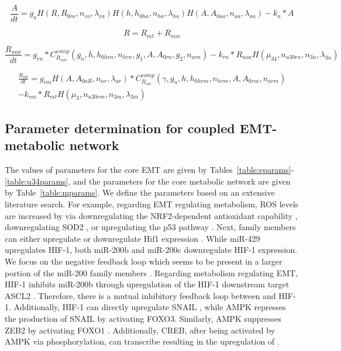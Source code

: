 \documentclass{article}
\begin{document}
\begin{equation}
\frac{A}{dt}= g_a H(R,R_{0ra},n_{ra}, \lambda_{ra}) H(h, h_{0ha},n_{ha}, \lambda_{ha}) H(A, A_{0aa},n_{aa}, \lambda_{aa})-k_a*A
\end{equation}

\begin{equation}
R = R_{mt}+R_{nox}
\end{equation}

\begin{equation}
        \frac{R_{nox}}{dt}= g_{rn}*C^{comp}_{R_{nox}}(g_n,h,h_{0hrn},n_{hrn}, g_1,A,A_{0rn},g_2,n_{arn})-k_{rn}*R_{nox} H(\mu_{34}, n_{u30rn}, n_{3n}, \lambda_{3n})
\end{equation}

\begin{multline}
\frac{R_{mt}}{dt}= g_{rm} H(A,A_{0aR},n_{ar},\lambda_{ar})*C^{comp}_{R_{mt}}(\gamma,g_n,h,h_{0hrm},n_{hrm},A,A_{0rm}, n_{arm})\\-k_{rm}*R_{mt} H(\mu_3,n_{u30rm},n_{3m},\lambda_{3m})
\end{multline}



\FloatBarrier
\subsection{Parameter determination for coupled EMT-metabolic network}
The values of parameters for the core EMT are given by Tables~\ref{table:eparams}-\ref{table:u34params}, and the parameters for the core metabolic network are given by Table~\ref{table:mparams}.
We define the parameters based on an extensive literature search.
For example, regarding EMT regulating metabolism, ROS levels are increased by  via  downregulating the NRF2-dependent antioxidant capability \cite{Kovac2015,He2020,Li2011} , downregulating SOD2 \cite{Bai2011}, or upregulating the p53 pathway \cite{Navarro2015,Italiano2012}.
Next,  family members can either upregulate or downregulate Hif1 expression \cite{Serocki2018} . 
While miR-429 upregulates HIF-1, both miR-200b \cite{Shang2017}  and miR-200c \cite{Byun2019} downregulate HIF-1 expression. 
We focus on the negative feedback loop which seems to be present in a larger portion of the miR-200 family members \cite{Serocki2018,Bartoszewska2015} .
Regarding metabolism regulating EMT, HIF-1 inhibits miR-200b  through upregulation of the HIF-1 downstream target ASCL2 \cite{Shang2017} .
Therefore, there is a mutual inhibitory feedback loop between  and HIF-1.
Additionally, HIF-1 can directly upregulate SNAIL \cite{Xu2015}, while AMPK represses the production of SNAIL \cite{Chou2014} by activating FOXO3.
Similarly, AMPK suppresses ZEB2 by activating FOXO1 \cite{Ohshima2019, Dong2016} . 
Additionally, CREB, after being activated by AMPK via phosphorylation, can transcribe  resulting in the upregulation of  \cite{Huang2015, Jin2019, Janin2016, Zhang2019,Thomson2008}.
\end{document}
